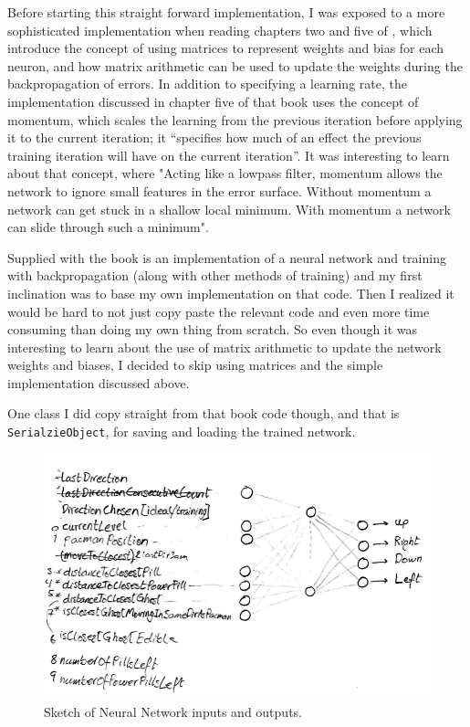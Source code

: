 \documentclass[conference]{IEEEtran}
\begin{document}
Before starting this straight forward implementation, I was exposed to a more sophisticated implementation when reading chapters two and five of \cite{heaton2008introduction}, which introduce the concept of using matrices to represent weights and bias for each neuron, and how matrix arithmetic can be used to update the weights during the backpropagation of errors.  In addition to specifying a learning rate, the implementation discussed in chapter five of that book uses the concept of momentum, which scales the learning from the previous iteration before applying it to the current iteration; it “specifies how much of an effect the previous training iteration will have on the current iteration”\cite{heaton2008introduction}.  It was interesting to learn about that concept, where "Acting like a lowpass filter, momentum allows the network to ignore small features in the error surface. Without momentum a network can get stuck in a shallow local minimum. With momentum a network can slide through such a minimum"\cite{traingdm}.

Supplied with the book is an implementation of a neural network and training with backpropagation (along with other methods of training) \cite{jeffheaton-bookcode} and my first inclination was to base my own implementation on that code.  Then I realized it would be hard to not just copy paste the relevant code and even more time consuming than doing my own thing from scratch.  So even though it was interesting to learn about the use of matrix arithmetic to update the network weights and biases, I decided to skip using matrices and the simple implementation discussed above.

One class I did copy straight from that book code though, and that is \texttt{SerialzieObject}, for saving and loading the trained network.


\begin{figure}[htp]
\centerline{\includegraphics[width=1\columnwidth]{ANNsketch.png}}
\caption{Sketch of Neural Network inputs and outputs.}
\label{annSketch}
\end{figure}
\end{document}
